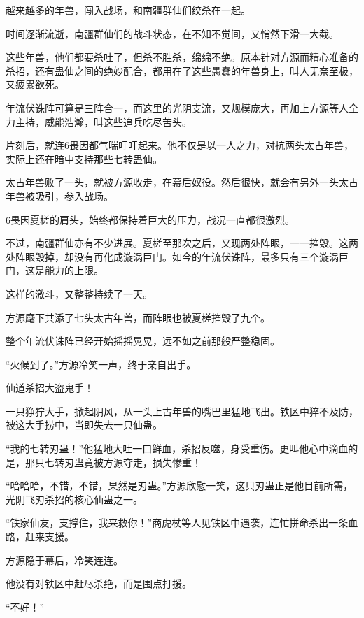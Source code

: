
\begin{this_body}



越来越多的年兽，闯入战场，和南疆群仙们绞杀在一起。

时间逐渐流逝，南疆群仙们的战斗状态，在不知不觉间，又悄然下滑一大截。

这些年兽，他们都要杀吐了，但杀不胜杀，绵绵不绝。原本针对方源而精心准备的杀招，还有蛊仙之间的绝妙配合，都用在了这些愚蠢的年兽身上，叫人无奈至极，又疲累欲死。

年流伏诛阵可算是三阵合一，而这里的光阴支流，又规模庞大，再加上方源等人全力主持，威能浩瀚，叫这些追兵吃尽苦头。

片刻后，就连6畏因都气喘吁吁起来。他不仅是以一人之力，对抗两头太古年兽，实际上还在暗中支持那些七转蛊仙。

太古年兽败了一头，就被方源收走，在幕后奴役。然后很快，就会有另外一头太古年兽被吸引，参入战场。

6畏因夏槎的肩头，始终都保持着巨大的压力，战况一直都很激烈。

不过，南疆群仙亦有不少进展。夏槎至那次之后，又现两处阵眼，一一摧毁。这两处阵眼毁掉，却没有再化成漩涡巨门。如今的年流伏诛阵，最多只有三个漩涡巨门，这是能力的上限。

这样的激斗，又整整持续了一天。

方源麾下共添了七头太古年兽，而阵眼也被夏槎摧毁了九个。

整个年流伏诛阵已经开始摇摇晃晃，远不如之前那般严整稳固。

“火候到了。”方源冷笑一声，终于亲自出手。

仙道杀招大盗鬼手！

一只狰狞大手，掀起阴风，从一头上古年兽的嘴巴里猛地飞出。铁区中猝不及防，被这大手捞中，当即失去一只仙蛊。

“我的七转刃蛊！”他猛地大吐一口鲜血，杀招反噬，身受重伤。更叫他心中滴血的是，那只七转刃蛊竟被方源夺走，损失惨重！

“哈哈哈，不错，不错，果然是刃蛊。”方源欣慰一笑，这只刃蛊正是他目前所需，光阴飞刃杀招的核心仙蛊之一。

“铁家仙友，支撑住，我来救你！”商虎杖等人见铁区中遇袭，连忙拼命杀出一条血路，赶来支援。

方源隐于幕后，冷笑连连。

他没有对铁区中赶尽杀绝，而是围点打援。

“不好！”


\end{this_body}
